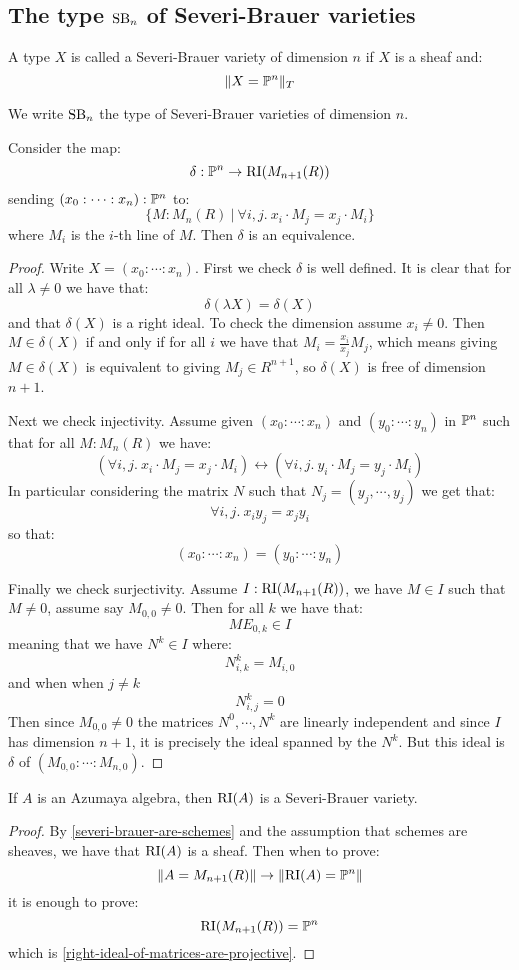 \subsection{The type $\mathrm{SB}_n$ of Severi-Brauer varieties}

\begin{definition}
A type $X$ is called a Severi-Brauer variety of dimension $n$ if $X$ is a sheaf and:
\[\lVert X=\mathbb{P}^n \rVert_T\]
\end{definition}

We write $\mathrm{SB}_n$ the type of Severi-Brauer varieties of dimension $n$.

\begin{lemma}\label{right-ideal-of-matrices-are-projective}
Consider the map:
\[\delta:\mathbb{P}^n \to \mathrm{RI}(M_{n+1}(R))\]
sending $(x_0:\cdots:x_n):\mathbb{P}^n$ to:
\[\{M:M_n(R)\ |\ \forall i,j.\ x_i\cdot M_j = x_j\cdot M_i\}\]
where $M_i$ is the $i$-th line of $M$. Then $\delta$ is an equivalence.
\end{lemma}

\begin{proof}
Write $X=(x_0:\cdots:x_n)$. First we check $\delta$ is well defined. It is clear that for all $\lambda\not=0$ we have that:
\[\delta(\lambda X) = \delta(X)\]
and that $\delta(X)$ is a right ideal. To check the dimension assume $x_i\not=0$. Then $M\in\delta(X)$ if and only if for all $i$ we have that $M_i = \frac{x_i}{x_j} M_j$, which means giving $M\in\delta(X)$ is equivalent to giving $M_j\in R^{n+1}$, so $\delta(X)$ is free of dimension $n+1$.

Next we check injectivity. Assume given $(x_0:\cdots:x_n)$ and $(y_0:\cdots:y_n)$ in $\mathbb{P}^n$ such that for all $M:M_n(R)$ we have:
\[(\forall i,j.\ x_i\cdot M_j = x_j\cdot M_i) \leftrightarrow (\forall i,j.\ y_i\cdot M_j = y_j\cdot M_i)\]
In particular considering the matrix $N$ such that $N_j = (y_j,\cdots,y_j)$ we get that:
\[\forall i,j.\ x_iy_j=x_jy_i\] 
so that:
\[(x_0:\cdots:x_n) = (y_0:\cdots:y_n)\]

Finally we check surjectivity. Assume $I:\mathrm{RI}(M_{n+1}(R))$, we have $M\in I$ such that $M\not=0$, assume say $M_{0,0}\not=0$. Then for all $k$ we have that:
\[ME_{0,k}\in I\]
meaning that we have $N^k\in I$ where:
\[N^k_{i,k} = M_{i,0}\]
and when when $j\not=k$
\[N^k_{i,j} = 0\]
Then since $M_{0,0}\not=0$ the matrices $N^0,\cdots,N^k$ are linearly independent and since $I$ has dimension $n+1$, it is precisely the ideal spanned by the $N^k$. But this ideal is $\delta$ of $(M_{0,0}:\cdots:M_{n,0})$.
\end{proof}

\begin{lemma}
If $A$ is an Azumaya algebra, then $\mathrm{RI}(A)$ is a Severi-Brauer variety.
\end{lemma}

\begin{proof}
By \cref{severi-brauer-are-schemes} and the assumption that schemes are sheaves, we have that $\mathrm{RI}(A)$ is a sheaf. Then when to prove:
\[\lVert A=M_{n+1}(R) \rVert \to \lVert \mathrm{RI}(A)=\mathbb{P}^n \rVert\]
it is enough to prove:
\[\mathrm{RI}(M_{n+1}(R)) = \mathbb{P}^n\]
which is \cref{right-ideal-of-matrices-are-projective}.
\end{proof}